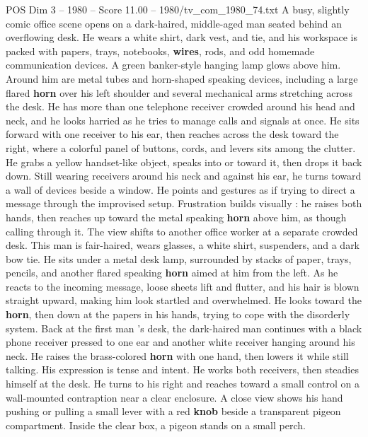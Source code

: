 \begin{textsample}{POS Dim 3 – 1980 – Score 11.00 – 1980/tv\_com\_1980\_74.txt}  \label{ex:f3_pos_043}
A busy, slightly comic office scene opens on a dark-haired, middle-aged man seated behind an overflowing desk.
He wears a white shirt, dark vest, and tie, and his workspace is packed with papers, trays, notebooks, \textbf{wires}, rods, and odd homemade communication devices.
A green banker-style hanging lamp glows above him.
Around him are metal tubes and horn-shaped speaking devices, including a large flared \textbf{horn} over his left shoulder and several mechanical arms stretching across the desk.
He has more than one telephone receiver crowded around his head and neck, and he looks harried as he tries to manage calls and signals at once.
He sits forward with one receiver to his ear, then reaches across the desk toward the right, where a colorful panel of buttons, cords, and levers sits among the clutter.
He grabs a yellow handset-like object, speaks into or toward it, then drops it back down.
Still wearing receivers around his neck and against his ear, he turns toward a wall of devices beside a window.
He points and gestures as if trying to direct a message through the improvised setup.
Frustration builds visually : he raises both hands, then reaches up toward the metal speaking \textbf{horn} above him, as though calling through it.
The view shifts to another office worker at a separate crowded desk.
This man is fair-haired, wears glasses, a white shirt, suspenders, and a dark bow tie.
He sits under a metal desk lamp, surrounded by stacks of paper, trays, pencils, and another flared speaking \textbf{horn} aimed at him from the left.
As he reacts to the incoming message, loose sheets lift and flutter, and his hair is blown straight upward, making him look startled and overwhelmed.
He looks toward the \textbf{horn}, then down at the papers in his hands, trying to cope with the disorderly system.
Back at the first man ’s desk, the dark-haired man continues with a black phone receiver pressed to one ear and another white receiver hanging around his neck.
He raises the brass-colored \textbf{horn} with one hand, then lowers it while still talking.
His expression is tense and intent.
He works both receivers, then steadies himself at the desk.
He turns to his right and reaches toward a small control on a wall-mounted contraption near a clear enclosure.
A close view shows his hand pushing or pulling a small lever with a red \textbf{knob} beside a transparent pigeon compartment.
Inside the clear box, a pigeon stands on a small perch.

\end{textsample}

